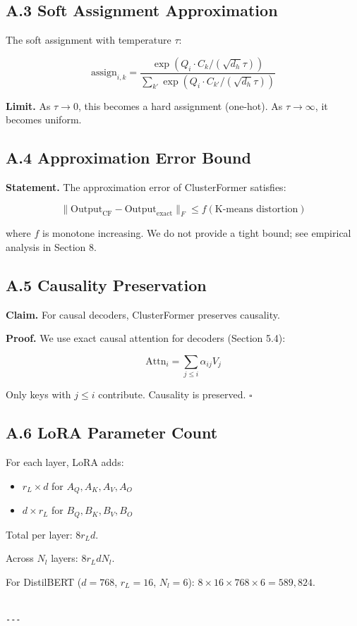 \subsection{A.3 Soft Assignment Approximation}

The soft assignment with temperature $\tau$:

\[
\text{assign}_{i,k} = \frac{\exp(Q_i \cdot C_k / (\sqrt{d_h} \tau))}{\sum_{k'} \exp(Q_i \cdot C_{k'} / (\sqrt{d_h} \tau))}
\]

\textbf{Limit.} As $\tau \to 0$, this becomes a hard assignment (one-hot). As 
$\tau \to \infty$, it becomes uniform.

\subsection{A.4 Approximation Error Bound}

\textbf{Statement.} The approximation error of ClusterFormer satisfies:

\[
\|\text{Output}_\text{CF} - \text{Output}_\text{exact}\|_F \leq f(\text{K-means distortion})
\]

where $f$ is monotone increasing. We do not provide a tight bound; see 
empirical analysis in Section 8.

\subsection{A.5 Causality Preservation}

\textbf{Claim.} For causal decoders, ClusterFormer preserves causality.

\textbf{Proof.} We use exact causal attention for decoders (Section 5.4):

\[
\text{Attn}_i = \sum_{j \leq i} \alpha_{ij} V_j
\]

Only keys with $j \leq i$ contribute. Causality is preserved. $\square$

\subsection{A.6 LoRA Parameter Count}

For each layer, LoRA adds:
\begin{itemize}
\item $r_L \times d$ for $A_Q, A_K, A_V, A_O$
\item $d \times r_L$ for $B_Q, B_K, B_V, B_O$

\end{itemize}
Total per layer: $8 r_L d$.

Across $N_l$ layers: $8 r_L d N_l$.

For DistilBERT ($d=768$, $r_L=16$, $N_l=6$): $8 \times 16 \times 768 \times 6 = 589{,}824$.
\begin{lstlisting}

---
\end{lstlisting}
